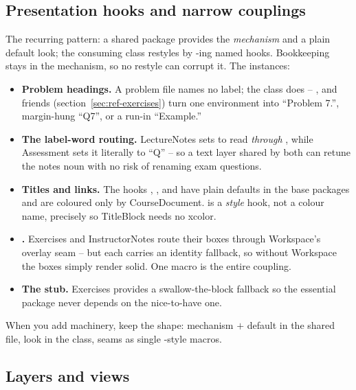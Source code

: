 \subsection{Presentation hooks and narrow couplings}\label{sec:hooks}

The recurring pattern: a shared package provides the \emph{mechanism} and
a plain default look; the consuming class restyles by
-ing named hooks. Bookkeeping stays in the mechanism, so
no restyle can corrupt it. The instances:

\begin{itemize}
  \item \textbf{Problem headings.} A problem file names no label; the
    class does -- ,  and
    friends (section~\ref{sec:ref-exercises}) turn one environment into
    ``Problem 7.'', margin-hung ``Q7'', or a run-in ``Example.''
  \item \textbf{The label-word routing.} LectureNotes sets
     to read \emph{through}
    , while Assessment sets it literally to
    ``Q'' -- so a text layer shared by both can retune the notes noun
    with no risk of renaming exam questions.
  \item \textbf{Titles and links.} The hooks ,
    ,  and  have plain defaults
    in the base packages and are coloured only by CourseDocument.
     is a \emph{style} hook, not a colour name, precisely
    so TitleBlock needs no xcolor.
  \item \textbf{.} Exercises and InstructorNotes route
    their boxes through Workspace's overlay seam -- but each carries an
      identity fallback, so
    without Workspace the boxes simply render solid. One macro is the
    entire coupling.
  \item \textbf{The  stub.} Exercises provides a
    swallow-the-block fallback so the essential package never depends on
    the nice-to-have one.
\end{itemize}

When you add machinery, keep the shape: mechanism $+$ default in the
shared file, look in the class, seams as single -style
macros.

\subsection{Layers and views}


